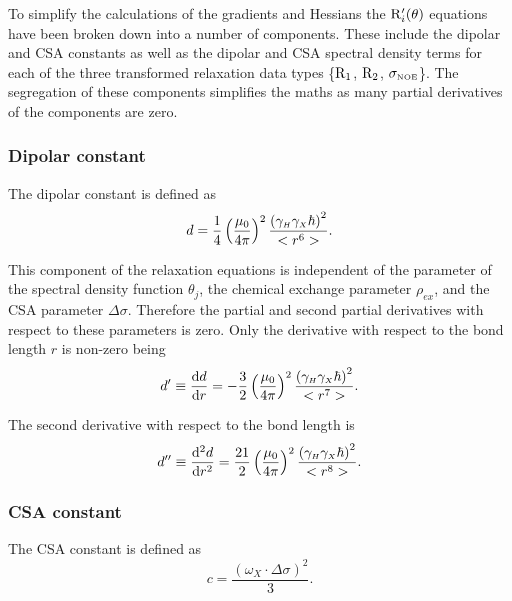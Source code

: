 To simplify the calculations of the gradients and Hessians the $\mathrm{R}_i'(\theta)$ equations have been broken down into a number of components.
These include the dipolar and CSA constants as well as the dipolar and CSA spectral density terms for each of the three transformed relaxation data types \{$\mathrm{R}_1$, $\mathrm{R}_2$, $\sigma_{\scriptscriptstyle \mathrm{NOE}}$\}.
The segregation of these components simplifies the maths as many partial derivatives of the components are zero.


\subsubsection{Dipolar constant}

The dipolar constant is defined as
\begin{equation}
    d = \frac{1}{4} \left(\frac{\mu_0}{4\pi}\right)^2 \frac{\left( \gamma_{\scriptscriptstyle H} \gamma_{\scriptscriptstyle X} \hbar \right)^2}{<r^6>}. \label{eq: Ri': d}
\end{equation}

\noindent This component of the relaxation equations is independent of the parameter of the spectral density function $\theta_j$, the chemical exchange parameter $\rho_{ex}$, and the CSA parameter $\Delta\sigma$.
Therefore the partial and second partial derivatives with respect to these parameters is zero.
Only the derivative with respect to the bond length $r$ is non-zero being
\begin{equation}
    d' \equiv \frac{\mathrm{d} d}{\mathrm{d} r} = - \frac{3}{2} \left(\frac{\mu_0}{4\pi}\right)^2 \frac{\left( \gamma_{\scriptscriptstyle H} \gamma_{\scriptscriptstyle X} \hbar \right)^2}{<r^7>}. \label{eq: Ri': d'}
\end{equation}

\noindent The second derivative with respect to the bond length is
\begin{equation}
    d'' \equiv \frac{\mathrm{d}^2 d}{\mathrm{d} r^2} = \frac{21}{2} \left(\frac{\mu_0}{4\pi}\right)^2 \frac{\left( \gamma_{\scriptscriptstyle H} \gamma_{\scriptscriptstyle X} \hbar \right)^2}{<r^8>}. \label{eq: Ri': d"}
\end{equation}


\subsubsection{CSA constant}

The CSA constant is defined as
\begin{equation}
    c = \frac{\left(\omega_X \cdot \Delta\sigma \right)^2}{3}. \label{eq: Ri': c}
\end{equation}

